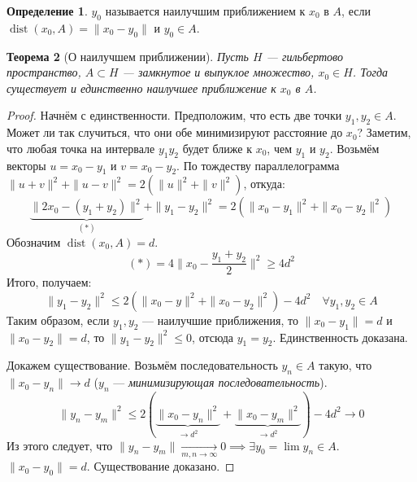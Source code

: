 \documentclass[11pt,openany,a4paper]{scrartcl}
\theoremstyle{plain}
\newtheorem{theorem}{Теорема}[section]
\theoremstyle{definition}
\newtheorem{definition}[theorem]{Определение}
\newcommand{\underto}[1]{\xrightarrow[#1]{}}
\DeclareMathOperator{\dist}{dist}
\begin{document}
\begin{definition}
    $y_0$ называется наилучшим приближением к $x_0$ в $A$, если
    $\dist(x_0, A) = \|x_0 - y_0\|$ и $y_0 \in A$.
\end{definition}

\begin{theorem}[О наилучшем приближении]
    Пусть $H$ — гильбертово пространство, $A \subset H$ — замкнутое и выпуклое 
    множество, $x_0 \in H$. Тогда существует и единственно наилучшее
    приближение к $x_0$ в $A$.
\end{theorem}
\begin{proof}
    Начнём с единственности. Предположим, что есть две точки $y_1, y_2 \in A$.
    Может ли так случиться, что они обе минимизируют расстояние до $x_0$? Заметим,
    что любая точка на интервале $y_1y_2$ будет ближе к $x_0$, чем $y_1$ и $y_2$.
    Возьмём векторы $u = x_0 - y_1$ и $v = x_0 - y_2$. По тождеству 
    параллелограмма $\|u + v\|^2 + \|u - v\|^2 = 2(\|u\|^2 + \|v\|^2)$, откуда:
    $$
    \underbrace{\|2x_0 - (y_1 + y_2)\|^2}_{(\ast)} + \|y_1 - y_2\|^2 =
    2(\|x_0 - y_1\|^2 + \|x_0 - y_2\|^2)
    $$
    Обозначим $\dist(x_0, A) = d$.
    $$
    (\ast) = 4\|x_0 - \frac{y_1 + y_2}{2}\|^2 \geqslant 4d^2
    $$
    Итого, получаем:
    $$
    \|y_1 - y_2\|^2 \leqslant 2(\|x_0 - y\|^2 + \|x_0 - y_2\|^2) - 4d^2
    \quad \forall y_1, y_2 \in A
    $$
    Таким образом, если $y_1, y_2$ — наилучшие приближения, то $\|x_0 - y_1\| = d$
    и $\|x_0 - y_2\| = d$, то $\|y_1 - y_2\|^2 \leqslant 0$, отсюда $y_1 = y_2$.
    Единственность доказана.
    
    Докажем существование. Возьмём последовательность $y_n \in A$ такую, что
    $\|x_0 - y_n\| \to d$ ($y_n$ — \emph{минимизирующая последовательность}).
    $$
    \|y_n - y_m\|^2 \leqslant 2(\underbrace{\|x_0 - y_n\|^2}_{\to d^2} +
    \underbrace{\|x_0 - y_m\|^2}_{\to d^2}) - 4d^2 \to 0
    $$
    Из этого следует, что $\|y_n - y_m\| \underto{m,n \to \infty} 0 \implies
    \exists y_0 = \lim y_n \in A$. $\|x_0 - y_0\| = d$. Существование доказано.
\end{proof}
\end{document}
